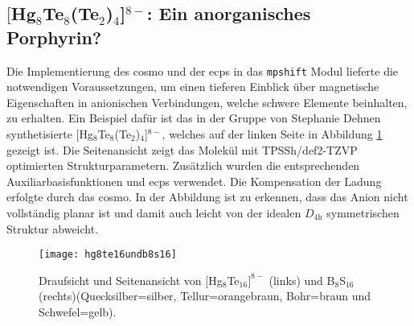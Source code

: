 \FloatBarrier
\newpage

\subsection{\texorpdfstring{$[$Hg$_8$Te$_8$(Te$_2$)$_4$]$^{8-}$}{[Hg\_8Te\_8(Te\_2)\_4]8-}: Ein anorganisches Porphyrin?}\label{anorgporh}
Die Implementierung des \ac{cosmo}\supercite{klamt1993cosmo} und der \acp{ecp} in das \texttt{mpshift} Modul lieferte die notwendigen Voraussetzungen, um einen tieferen Einblick über magnetische Eigenschaften in anionischen Verbindungen, welche schwere Elemente beinhalten, zu erhalten. Ein Beispiel dafür ist das in der Gruppe von Stephanie Dehnen synthetisierte $[$Hg$_8$Te$_8$(Te$_2$)$_4$]$^{8-}$\supercite{dehnenhg4te8}, welches auf der linken Seite in Abbildung \ref{abb:hg8te16undb8s16} gezeigt ist. Die Seitenansicht zeigt das Molekül mit TPSSh\supercite{tao2003climbing}/def2-TZVP\supercite{weigend2005balanced} optimierten Strukturparametern. Zusätzlich wurden die entsprechenden Auxiliarbasisfunktionen\supercite{weigend2006accurate} und \acp{ecp}\supercite{peterson2003systematically} verwendet. Die Kompensation der Ladung erfolgte durch das \ac{cosmo}. In der Abbildung ist zu erkennen, dass das Anion nicht vollständig planar ist und damit auch leicht von der idealen $D_{4\textrm{h}}$ symmetrischen Struktur abweicht. 
\begin{figure}[ht!]
	\centering
	\texttt{[image: hg8te16undb8s16]}
	\captionsetup{figurewithin = chapter}
	\captionsetup{font=small, labelfont=bf}\caption[{Abbildung von $[$Hg$_8$Te$_{16}]^{8-}$ und B$_8$S$_{16}$}]{{Draufsicht und Seitenansicht von $[$Hg$_8$Te$_{16}]^{8-}$} (links) und B$_8$S$_{16}$ (rechts)(Quecksilber=silber, Tellur=orangebraun, Bohr=braun und Schwefel=gelb).}
\label{abb:hg8te16undb8s16}
\end{figure}

